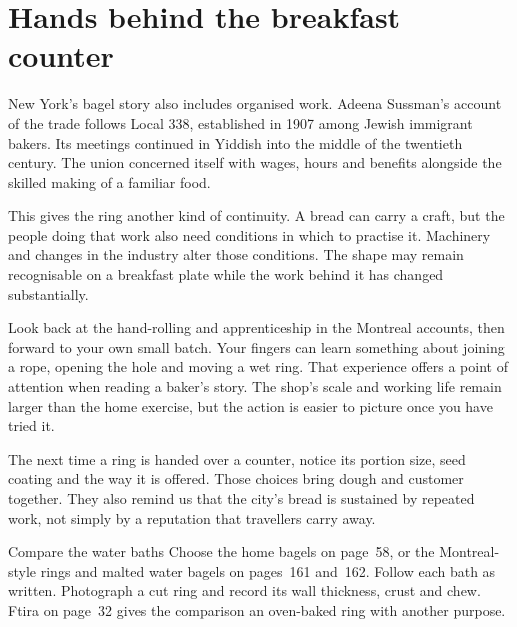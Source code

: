 \section{Hands behind the breakfast counter}
New York's bagel story also includes organised work. Adeena Sussman's account of the trade follows Local 338, established in 1907 among Jewish immigrant bakers. Its meetings continued in Yiddish into the middle of the twentieth century. The union concerned itself with wages, hours and benefits alongside the skilled making of a familiar food.\citep{unionbagel08}

This gives the ring another kind of continuity. A bread can carry a craft, but the people doing that work also need conditions in which to practise it. Machinery and changes in the industry alter those conditions. The shape may remain recognisable on a breakfast plate while the work behind it has changed substantially.

Look back at the hand-rolling and apprenticeship in the Montreal accounts, then forward to your own small batch. Your fingers can learn something about joining a rope, opening the hole and moving a wet ring. That experience offers a point of attention when reading a baker's story. The shop's scale and working life remain larger than the home exercise, but the action is easier to picture once you have tried it.

The next time a ring is handed over a counter, notice its portion size, seed coating and the way it is offered. Those choices bring dough and customer together. They also remind us that the city's bread is sustained by repeated work, not simply by a reputation that travellers carry away.

\begin{breadnote}{Compare the water baths}
Choose the home bagels on page~58, or the Montreal-style rings and malted water bagels on pages~161 and~162. Follow each bath as written. Photograph a cut ring and record its wall thickness, crust and chew. Ftira on page~32 gives the comparison an oven-baked ring with another purpose.
\end{breadnote}
